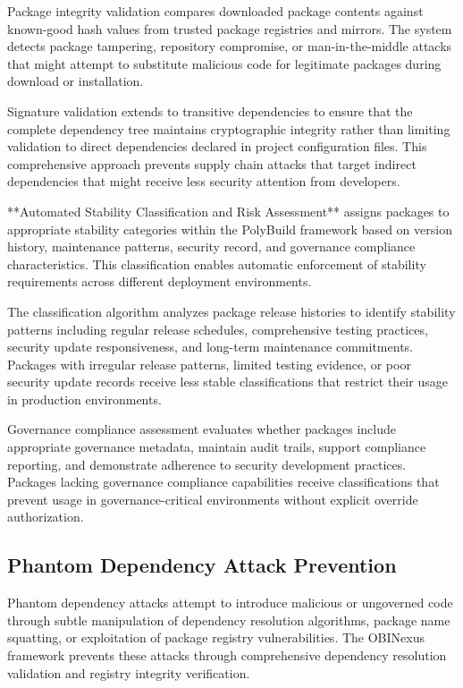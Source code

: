 Package integrity validation compares downloaded package contents against known-good hash values from trusted package registries and mirrors. The system detects package tampering, repository compromise, or man-in-the-middle attacks that might attempt to substitute malicious code for legitimate packages during download or installation.

Signature validation extends to transitive dependencies to ensure that the complete dependency tree maintains cryptographic integrity rather than limiting validation to direct dependencies declared in project configuration files. This comprehensive approach prevents supply chain attacks that target indirect dependencies that might receive less security attention from developers.

**Automated Stability Classification and Risk Assessment** assigns packages to appropriate stability categories within the PolyBuild framework based on version history, maintenance patterns, security record, and governance compliance characteristics. This classification enables automatic enforcement of stability requirements across different deployment environments.

The classification algorithm analyzes package release histories to identify stability patterns including regular release schedules, comprehensive testing practices, security update responsiveness, and long-term maintenance commitments. Packages with irregular release patterns, limited testing evidence, or poor security update records receive less stable classifications that restrict their usage in production environments.

Governance compliance assessment evaluates whether packages include appropriate governance metadata, maintain audit trails, support compliance reporting, and demonstrate adherence to security development practices. Packages lacking governance compliance capabilities receive classifications that prevent usage in governance-critical environments without explicit override authorization.

\subsection{Phantom Dependency Attack Prevention}

Phantom dependency attacks attempt to introduce malicious or ungoverned code through subtle manipulation of dependency resolution algorithms, package name squatting, or exploitation of package registry vulnerabilities. The OBINexus framework prevents these attacks through comprehensive dependency resolution validation and registry integrity verification.

